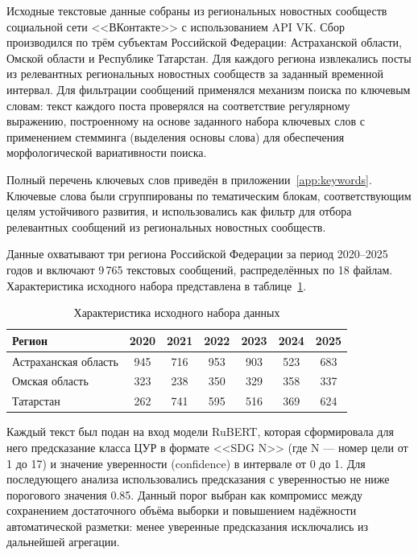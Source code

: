 \documentclass[master, och, coursework]{SCWorks1}
\begin{document}
Исходные текстовые данные собраны из региональных новостных сообществ социальной сети <<ВКонтакте>> с использованием API VK. Сбор производился по трём субъектам Российской Федерации: Астраханской области, Омской области и Республике Татарстан. Для каждого региона извлекались посты из релевантных региональных новостных сообществ за заданный временной интервал. Для фильтрации сообщений применялся механизм поиска по ключевым словам: текст каждого поста проверялся на соответствие регулярному выражению, построенному на основе заданного набора ключевых слов с применением стемминга (выделения основы слова) для обеспечения морфологической вариативности поиска.

Полный перечень ключевых слов приведён в приложении~\ref{app:keywords}. Ключевые слова были сгруппированы по тематическим блокам, соответствующим целям устойчивого развития, и использовались как фильтр для отбора релевантных сообщений из региональных новостных сообществ.

Данные охватывают три региона Российской Федерации за период 2020--2025 годов и включают 9\,765 текстовых сообщений, распределённых по 18 файлам. Характеристика исходного набора представлена в таблице~\ref{tab:dataset}.

\begin{table}[H]
\caption{Характеристика исходного набора данных}
\label{tab:dataset}
\centering\small
\begin{tabular}{|l|c|c|c|c|c|c|}
\hline
Регион & 2020 & 2021 & 2022 & 2023 & 2024 & 2025 \\
\hline
Астраханская область & 945 & 716 & 953 & 903 & 523 & 683 \\
Омская область       & 323 & 238 & 350 & 329 & 358 & 337 \\
Татарстан            & 262 & 741 & 595 & 516 & 369 & 624 \\
\hline
\end{tabular}
\end{table}

Каждый текст был подан на вход модели RuBERT, которая сформировала для него предсказание класса ЦУР в формате <<SDG N>> (где N --- номер цели от 1 до 17) и значение уверенности (confidence) в интервале от 0 до 1. Для последующего анализа использовались предсказания с уверенностью не ниже порогового значения 0.85. Данный порог выбран как компромисс между сохранением достаточного объёма выборки и повышением надёжности автоматической разметки: менее уверенные предсказания исключались из дальнейшей агрегации.
\end{document}
